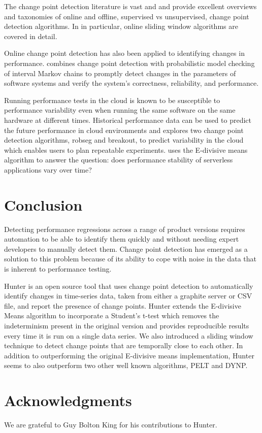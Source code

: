 \documentclass[sigconf]{acmart}
\begin{document}
The change point detection literature is vast and \cite{SURVEYCOOK} and \cite{SELECTREVIEW} provide excellent overviews and taxonomies of online and offline, supervised vs unsupervised, change point detection algorithms. In \cite{SURVEYCOOK} in particular, online sliding window algorithms are covered in detail.

Online change point detection has also been applied to identifying changes in performance. \cite{INTERVALCPD} combines change point detection with probabilistic model checking of interval Markov chains to promptly detect changes in the parameters of software systems and verify the system’s correctness, reliability, and performance.

Running performance tests in the cloud is known to be susceptible to performance variability \cite{BIGDATA} even when running the same software on the same hardware at different times. Historical performance data can be used to predict the future performance in cloud environments and \cite{CLOUDPREDICT} explores two change point detection algorithms, robseg and breakout, to predict variability in the cloud which enables users to plan repeatable experiments. \cite{CASESTUDYCPD} uses the E-divisive means algorithm to answer the question: does performance stability of serverless applications vary over time?


\section{Conclusion}
Detecting performance regressions across a range of product versions requires automation to be able to identify them quickly and without needing expert developers to manually detect them. Change point detection has emerged as a solution to this problem because of its ability to cope with noise in the data that is inherent to performance testing.

Hunter is an open source\cite{HUNTER} tool that uses change point detection to automatically identify changes in
time-series data, taken from either a graphite server or CSV file, and report the presence of change
points. Hunter extends the E-divisive Means algorithm to incorporate a Student's t-test which
removes the indeterminism present in the original version and provides reproducible results every time it is run on a single data series. We also introduced a sliding window technique to detect change points that are temporally close to each other. In addition to outperforming the original E-divisive means implementation, Hunter seems to also outperform two other well known algorithms, PELT and DYNP.

\section{Acknowledgments}
We are grateful to Guy Bolton King for his contributions to Hunter.


\balance

\end{document}
